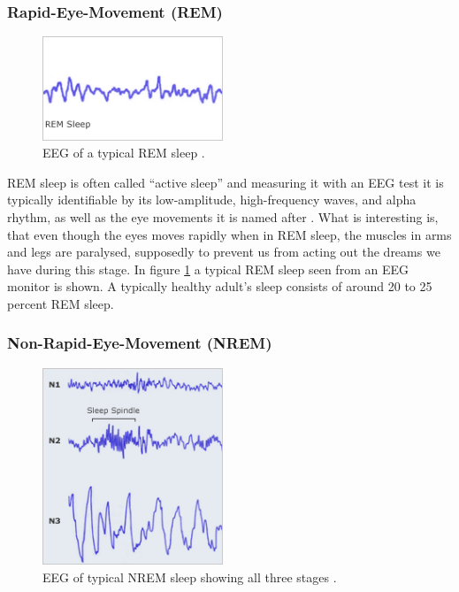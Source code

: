 \documentclass[12pt]{article} %
\begin{document}
\subsubsection{Rapid-Eye-Movement (REM)}
\begin{figure}
  \begin{center}
    \includegraphics[width=0.48\textwidth]{img/rem}
  \end{center}
    \vspace{-20pt}
  \caption{EEG of a typical REM sleep \cite{harvard}.}
  \label{fig:rem}
\end{figure}

REM sleep is often called ``active sleep'' and measuring it with an EEG test it is typically identifiable by its low-amplitude, high-frequency waves, and alpha rhythm, as well as the eye movements it is named after \cite{harvard}. What is interesting is, that even though the eyes moves rapidly when in REM sleep, the muscles in arms and legs are paralysed, supposedly to prevent us from acting out the dreams we have during this stage. In figure \ref{fig:rem} a typical REM sleep seen from an EEG monitor is shown. A typically healthy adult's sleep consists of around 20 to 25 percent REM sleep. 

\subsubsection{Non-Rapid-Eye-Movement (NREM)}
\begin{figure}
  \vspace{-25pt}
  \begin{center}
    \includegraphics[width=0.48\textwidth]{img/nrem}
  \end{center}
    \vspace{-20pt}
  \caption{EEG of typical NREM sleep showing all three stages \cite{harvard}.}
        \vspace{-20pt}
  \label{fig:nrem}
\end{figure}
\end{document}
